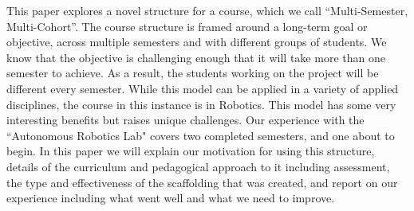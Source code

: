 This paper explores a novel structure for a course, which we call ``Multi-Semester, Multi-Cohort”. The course structure is framed around a long-term goal or objective, across multiple semesters and with different groups of students. We know that the objective is challenging enough that it will take more than one semester to achieve. As a result, the students working on the project will be different every semester. While this model can be applied in a variety of applied disciplines, the course in this instance is in Robotics. This model has some very interesting benefits but raises unique challenges. Our experience with the ``Autonomous Robotics Lab" covers two completed semesters, and one about to begin. In this paper we will explain our motivation for using this structure, details of the curriculum and pedagogical approach to it including assessment, the type and effectiveness of the scaffolding that was created, and report on our experience including what went well and what we need to improve.
